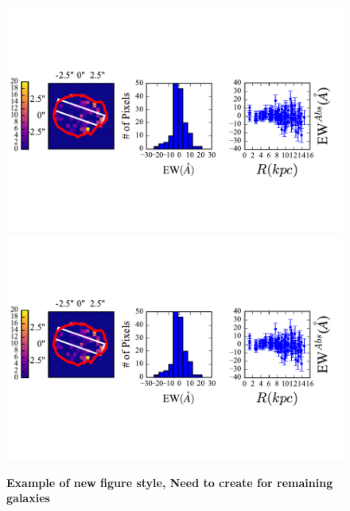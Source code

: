 \documentclass[twocolumn]{aastex61}
\begin{document}
\begin{figure}[]
\centering
\includegraphics[scale=1.1]{../Figures/J57EW.pdf}
\includegraphics[scale=1.1]{../Figures/J57EW.pdf}
\caption{\textbf{Example of new figure style, Need to create for remaining galaxies}}
\label{fig:ew55}
\end{figure}
\end{document}
